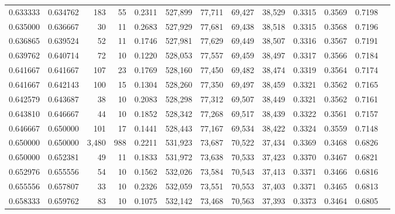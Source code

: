 \begin{tabular}{rrrrrrrrrrrrr}
0.633333 & 0.634762 &    183 &     55 &                                     0.2311 & 527,899 &  77,711 &  69,427 &  38,529 & 0.3315 & 0.3569 & 0.7198 \\
0.635000 & 0.636667 &     30 &     11 &                                     0.2683 & 527,929 &  77,681 &  69,438 &  38,518 & 0.3315 & 0.3568 & 0.7196 \\
0.636865 & 0.639524 &     52 &     11 &                                     0.1746 & 527,981 &  77,629 &  69,449 &  38,507 & 0.3316 & 0.3567 & 0.7191 \\
0.639762 & 0.640714 &     72 &     10 &                                     0.1220 & 528,053 &  77,557 &  69,459 &  38,497 & 0.3317 & 0.3566 & 0.7184 \\
0.641667 & 0.641667 &    107 &     23 &                                     0.1769 & 528,160 &  77,450 &  69,482 &  38,474 & 0.3319 & 0.3564 & 0.7174 \\
0.641667 & 0.642143 &    100 &     15 &                                     0.1304 & 528,260 &  77,350 &  69,497 &  38,459 & 0.3321 & 0.3562 & 0.7165 \\
0.642579 & 0.643687 &     38 &     10 &                                     0.2083 & 528,298 &  77,312 &  69,507 &  38,449 & 0.3321 & 0.3562 & 0.7161 \\
0.643810 & 0.646667 &     44 &     10 &                                     0.1852 & 528,342 &  77,268 &  69,517 &  38,439 & 0.3322 & 0.3561 & 0.7157 \\
0.646667 & 0.650000 &    101 &     17 &                                     0.1441 & 528,443 &  77,167 &  69,534 &  38,422 & 0.3324 & 0.3559 & 0.7148 \\
0.650000 & 0.650000 &  3,480 &    988 &                                     0.2211 & 531,923 &  73,687 &  70,522 &  37,434 & 0.3369 & 0.3468 & 0.6826 \\
0.650000 & 0.652381 &     49 &     11 &                                     0.1833 & 531,972 &  73,638 &  70,533 &  37,423 & 0.3370 & 0.3467 & 0.6821 \\
0.652976 & 0.655556 &     54 &     10 &                                     0.1562 & 532,026 &  73,584 &  70,543 &  37,413 & 0.3371 & 0.3466 & 0.6816 \\
0.655556 & 0.657807 &     33 &     10 &                                     0.2326 & 532,059 &  73,551 &  70,553 &  37,403 & 0.3371 & 0.3465 & 0.6813 \\
0.658333 & 0.659762 &     83 &     10 &                                     0.1075 & 532,142 &  73,468 &  70,563 &  37,393 & 0.3373 & 0.3464 & 0.6805 \\

\end{tabular}
